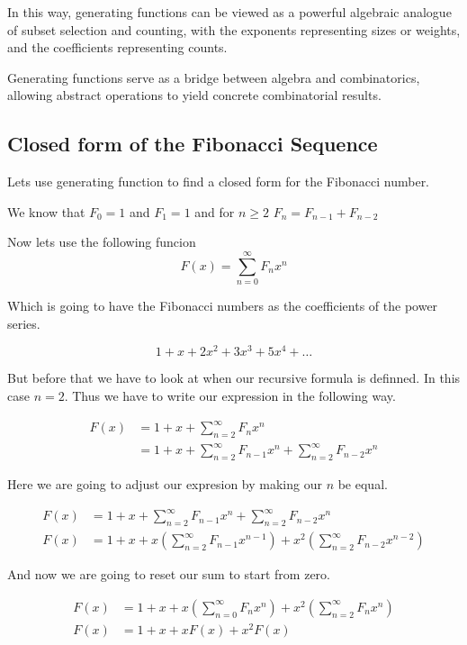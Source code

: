 In this way, generating functions can be viewed as a powerful algebraic analogue of subset selection and counting, with the exponents representing sizes or weights, and the coefficients representing counts.

Generating functions serve as a bridge between algebra and combinatorics, allowing abstract operations to yield concrete combinatorial results.

\subsection{Closed form of the Fibonacci Sequence}

Lets use generating function to find a closed form for the Fibonacci number. 

We know that \(F_0 = 1\) and \(F_1 = 1\) and for \(n \ge 2\) \(F_n = F_{n-1} + F_{n-2}\)


Now lets use the following funcion
\[
    F(x) = \sum_{n = 0}^{\infty} F_n x^{n}
\]

Which is going to have the Fibonacci numbers as the coefficients of the power series.

\[
    1 + x + 2x^2 + 3x^3 + 5x^4 + \dots
\]

But before that we have to look at when our recursive formula is definned.
In this case \(n = 2\). Thus we have to write our expression in the following way.

\begin{align*}
F(x) &= 1 + x + \sum_{n = 2}^{\infty} F_n x^{n}\\
&= 1 + x + \sum_{n = 2}^{\infty} F_{n -1} x^{n} + \sum_{n = 2}^{\infty} F_{n - 2}x^n 
\end{align*}

Here we are going to adjust our expresion by making our \(n\) be equal.

\begin{align*}
F(x) &= 1 + x + \sum_{n = 2}^{\infty} F_{n -1} x^{n} + \sum_{n = 2}^{\infty} F_{n - 2}x^n \\ 
F(x) &= 1 + x + x \left( \sum_{n = 2}^{\infty} F_{n -1} x^{n-1}\right) + x^2 \left( \sum_{n = 2}^{\infty} F_{n -2} x^{n-2}\right)
\end{align*}

And now we are going to reset our sum to start from zero.

\begin{align*}
F(x) &= 1 + x + x \left( \sum_{n = 0}^{\infty} F_{n} x^{n}\right) + x^2 \left( \sum_{n = 2}^{\infty} F_{n} x^{n}\right)\\
F(x) &= 1 + x + x F(x) + x^2 F(x)
\end{align*}

